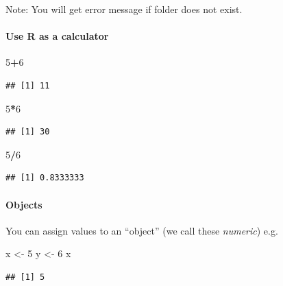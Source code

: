 \documentclass[
]{article}
\newenvironment{Shaded}{\begin{snugshade}}{\end{snugshade}}
\newcommand{\DecValTok}[1]{\textcolor[rgb]{0.00,0.00,0.81}{#1}}
\newcommand{\NormalTok}[1]{#1}
\newcommand{\OperatorTok}[1]{\textcolor[rgb]{0.81,0.36,0.00}{\textbf{#1}}}
\newcommand{\StringTok}[1]{\textcolor[rgb]{0.31,0.60,0.02}{#1}}
\begin{document}
Note: You will get error message if folder does not exist.

\hypertarget{use-r-as-a-calculator}{%
\paragraph{Use R as a calculator}\label{use-r-as-a-calculator}}

\begin{Shaded}
\begin{Highlighting}[]
\DecValTok{5}\OperatorTok{+}\DecValTok{6}
\end{Highlighting}
\end{Shaded}

\begin{verbatim}
## [1] 11
\end{verbatim}

\begin{Shaded}
\begin{Highlighting}[]
\DecValTok{5}\OperatorTok{*}\DecValTok{6}
\end{Highlighting}
\end{Shaded}

\begin{verbatim}
## [1] 30
\end{verbatim}

\begin{Shaded}
\begin{Highlighting}[]
\DecValTok{5}\OperatorTok{/}\DecValTok{6}
\end{Highlighting}
\end{Shaded}

\begin{verbatim}
## [1] 0.8333333
\end{verbatim}

\hypertarget{objects}{%
\paragraph{Objects}\label{objects}}

You can assign values to an ``object'' (we call these \emph{numeric})
e.g.

\begin{Shaded}
\begin{Highlighting}[]
\NormalTok{x <-}\StringTok{ }\DecValTok{5}
\NormalTok{y <-}\StringTok{ }\DecValTok{6}
\NormalTok{x}
\end{Highlighting}
\end{Shaded}

\begin{verbatim}
## [1] 5
\end{verbatim}
\end{document}
